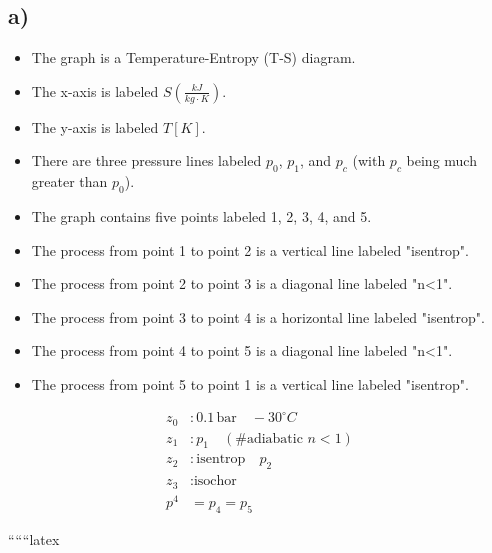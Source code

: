 

\subsection*{a)}

\begin{itemize}
    \item The graph is a Temperature-Entropy (T-S) diagram.
    \item The x-axis is labeled $S \left( \frac{kJ}{kg \cdot K} \right)$.
    \item The y-axis is labeled $T [K]$.
    \item There are three pressure lines labeled $p_0$, $p_1$, and $p_c$ (with $p_c$ being much greater than $p_0$).
    \item The graph contains five points labeled 1, 2, 3, 4, and 5.
    \item The process from point 1 to point 2 is a vertical line labeled "isentrop".
    \item The process from point 2 to point 3 is a diagonal line labeled "n<1".
    \item The process from point 3 to point 4 is a horizontal line labeled "isentrop".
    \item The process from point 4 to point 5 is a diagonal line labeled "n<1".
    \item The process from point 5 to point 1 is a vertical line labeled "isentrop".
\end{itemize}

\begin{align*}
    z_0 &: 0.1 \, \text{bar} \quad -30^\circ C \\
    z_1 &: p_1 \quad (\text{\# adiabatic } n<1) \\
    z_2 &: \text{isentrop} \quad p_2 \\
    z_3 &: \text{isochor} \\
    p^4 &= p_4 = p_5
\end{align*}

``````latex